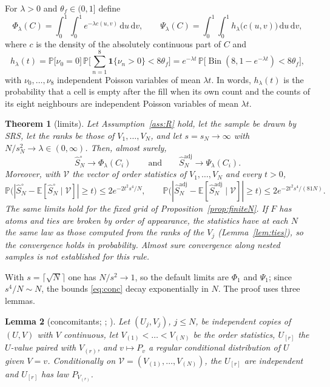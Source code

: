 \documentclass[11pt,a4paper]{article}
\newtheorem{theorem}{Theorem}[section]
\newtheorem{lemma}[theorem]{Lemma}
\theoremstyle{definition}
\theoremstyle{remark}
\newcommand{\E}{\mathbb{E}}
\newcommand{\Prob}{\mathbb{P}}
\newcommand{\ind}{\mathbf{1}}
\newcommand{\cV}{\mathcal{V}}
\newcommand{\Sadj}{\hat S^{\mathrm{adj}}_N}
\newcommand{\Sun}{\hat S^{\circ}_N}
\newcommand{\Bin}{\operatorname{Bin}}
\begin{document}
For $\lambda>0$ and $\theta_f\in(0,1]$ define
\begin{equation}\label{eq:functionals}
\Phi_\lambda(C)=\int_0^1\!\!\int_0^1 e^{-\lambda c(u,v)}\,\mathrm{d}u\,\mathrm{d}v,\qquad
\Psi_\lambda(C)=\int_0^1\!\!\int_0^1 h_\lambda\big(c(u,v)\big)\,\mathrm{d}u\,\mathrm{d}v,
\end{equation}
where $c$ is the density of the absolutely continuous part of $C$ and
\begin{equation}\label{eq:h}
h_\lambda(t)=\Prob\big[\nu_0=0\big]\,\Prob\Big[\textstyle\sum_{n=1}^8\ind\{\nu_n>0\}<8\theta_f\Big]
=e^{-\lambda t}\,\Prob\big[\Bin(8,1-e^{-\lambda t})<8\theta_f\big],
\end{equation}
with $\nu_0,\dots,\nu_8$ independent Poisson variables of mean $\lambda t$. In words, $h_\lambda(t)$ is the probability that a cell is empty after the fill when its own count and the counts of its eight neighbours are independent Poisson variables of mean $\lambda t$.

\begin{theorem}[limits]\label{thm:limits}
Let Assumption~\ref{ass:R} hold, let the sample be drawn by SRS, let the ranks be those of $V_1,\dots,V_N$, and let $s=s_N\to\infty$ with $N/s_N^2\to\lambda\in(0,\infty)$. Then, almost surely,
\[
\Sun\to\Phi_\lambda(C_i)\qquad\text{and}\qquad\Sadj\to\Psi_\lambda(C_i).
\]
Moreover, with $\cV$ the vector of order statistics of $V_1,\dots,V_N$ and every $t>0$,
\begin{equation}\label{eq:conc}
\Prob\big(|\Sun-\E[\Sun\mid\cV]|\ge t\big)\le2e^{-2t^2s^4/N},\qquad
\Prob\big(|\Sadj-\E[\Sadj\mid\cV]|\ge t\big)\le2e^{-2t^2s^4/(81N)}.
\end{equation}
The same limits hold for the fixed grid of Proposition~\ref{prop:finiteN}. If $F$ has atoms and ties are broken by order of appearance, the statistics have at each $N$ the same law as those computed from the ranks of the $V_j$ (Lemma~\ref{lem:ties}), so the convergence holds in probability. Almost sure convergence along nested samples is not established for this rule.
\end{theorem}

With $s=\lceil\sqrt N\rceil$ one has $N/s^2\to1$, so the default limits are $\Phi_1$ and $\Psi_1$; since $s^4/N\sim N$, the bounds \eqref{eq:conc} decay exponentially in $N$. The proof uses three lemmas.

\begin{lemma}[{concomitants; \citealp{yang1977}; \citealp[Section~6.8]{david2003}}]\label{lem:concomitants}
Let $(U_j,V_j)$, $j\le N$, be independent copies of $(U,V)$ with $V$ continuous, let $V_{(1)}<\dots<V_{(N)}$ be the order statistics, $U_{[r]}$ the $U$-value paired with $V_{(r)}$, and $v\mapsto P_v$ a regular conditional distribution of $U$ given $V=v$. Conditionally on $\cV=(V_{(1)},\dots,V_{(N)})$, the $U_{[r]}$ are independent and $U_{[r]}$ has law $P_{V_{(r)}}$.
\end{lemma}
\end{document}
